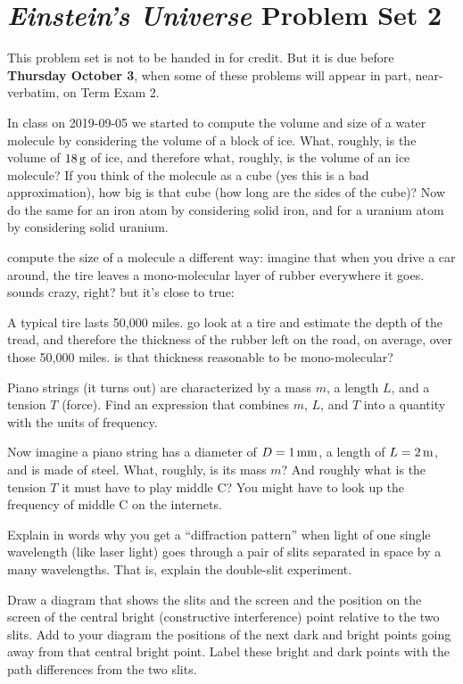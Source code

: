 \documentclass[12pt, letterpaper]{article}
\begin{document}
\section*{\textsl{Einstein's Universe} Problem Set 2}

This problem set is not to be handed in for credit. But it is due
before \textbf{Thursday October 3}, when some of these problems
will appear in part, near-verbatim, on Term Exam 2.

\begin{problem}
In class on 2019-09-05 we started to compute the volume and size of a
water molecule by considering the volume of a block of ice. What,
roughly, is the volume of $18\,\mathrm{g}$ of ice, and therefore what,
roughly, is the volume of an ice molecule? If you think of the
molecule as a cube (yes this is a bad approximation), how big is that
cube (how long are the sides of the cube)? Now do the same for an iron
atom by considering solid iron, and for a uranium atom by considering
solid uranium.
\end{problem}

\begin{problem}
compute the size of a molecule a different way: imagine that when you
drive a car around, the tire leaves a mono-molecular layer of rubber
everywhere it goes. sounds crazy, right? but it's close to true:

A typical tire lasts 50,000 miles. go look at a tire and estimate the
depth of the tread, and therefore the thickness of the rubber left on
the road, on average, over those 50,000 miles. is that thickness
reasonable to be mono-molecular?
\end{problem}

\begin{problem}
Piano strings (it turns out) are characterized by a mass $m$, a length
$L$, and a tension $T$ (force). Find an expression that combines $m$,
$L$, and $T$ into a quantity with the units of frequency.

Now imagine a piano string has a diameter of $D=1\,\mathrm{mm}$, a length of
$L=2\,\mathrm{m}$, and is made of steel. What, roughly, is its mass $m$? And
roughly what is the tension $T$ it must have to play middle C? You
might have to look up the frequency of middle C on the internets.
\end{problem}

\begin{problem}
Explain in words why you get a ``diffraction pattern'' when light of
one single wavelength (like laser light) goes through a pair of slits
separated in space by a many wavelengths. That is, explain the
double-slit experiment.

Draw a diagram that shows the slits and the screen and the position on
the screen of the central bright (constructive interference) point
relative to the two slits. Add to your diagram the positions of the
next dark and bright points going away from that central bright
point. Label these bright and dark points with the path differences
from the two slits.
\end{problem}
\end{document}

